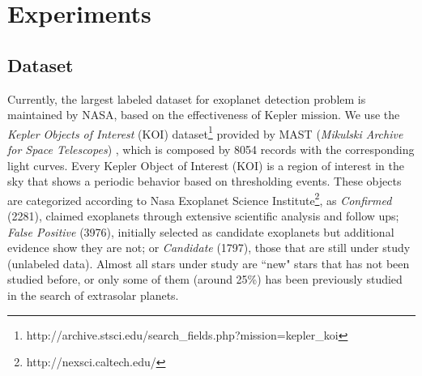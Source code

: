 \section{Experiments}

\subsection{Dataset}
Currently, the largest labeled dataset for exoplanet detection problem is maintained by NASA, based on the effectiveness of Kepler mission. %
We use the \textit{Kepler Objects of Interest} (KOI) dataset\footnote{http://archive.stsci.edu/search\_fields.php?mission=kepler\_koi} provided by MAST (\textit{Mikulski Archive for Space Telescopes}) \citep{akeson2013nasa}, which is composed by 8054 records with the corresponding light curves. Every Kepler Object of Interest (KOI) is a region of interest in the sky that shows a periodic behavior based on thresholding events. 
These objects are categorized according to Nasa Exoplanet Science Institute\footnote{http://nexsci.caltech.edu/}, as \textit{Confirmed} (2281), claimed exoplanets through extensive scientific analysis and follow ups; \textit{False Positive} (3976), initially selected as candidate exoplanets but additional evidence show they are not; or \textit{Candidate} (1797), those that are still under study (unlabeled data).
Almost all stars under study are ``new" stars that has not been studied before, or only some of them (around 25\%) has been previously studied in the search of extrasolar planets.


